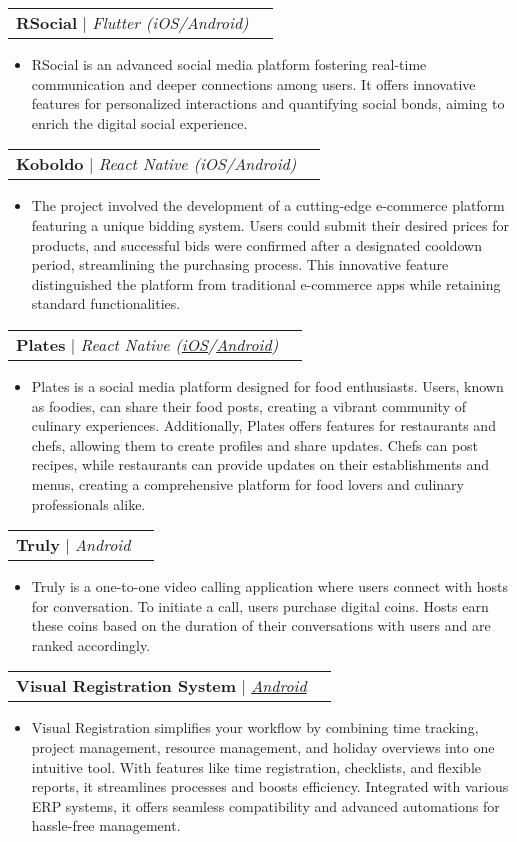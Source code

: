 \documentclass[letterpaper,11pt]{article}
\makeatletter
\newcommand{\resumeItem}[1]{
  \item\small{
    {#1 \vspace{-2pt}}
  }
}
\newcommand{\resumeProjectHeading}[2]{
    \vspace{-2pt}\item
    \begin{tabular*}{0.97\textwidth}{l@{\extracolsep{\fill}}r}
      \small#1 & #2 \\
    \end{tabular*}\vspace{-7pt}
}
\newcommand{\resumeItemListStart}{\begin{itemize}}
\newcommand{\resumeItemListEnd}{\end{itemize}\vspace{-5pt}}
\makeatother
\begin{document}
    \resumeProjectHeading
        {\textbf{RSocial} $|$ \emph{{Flutter (iOS/Android)}}}{}
          \resumeItemListStart
            \resumeItem{RSocial is an advanced social media platform fostering real-time communication and deeper connections among users. It offers innovative features for personalized interactions and quantifying social bonds, aiming to enrich the digital social experience.}
          \resumeItemListEnd

    \resumeProjectHeading
        {\textbf{Koboldo} $|$ \emph{{React Native (iOS/Android)}}}{}
          \resumeItemListStart
            \resumeItem{The project involved the development of a cutting-edge e-commerce platform featuring a unique bidding system. Users could submit their desired prices for products, and successful bids were confirmed after a designated cooldown period, streamlining the purchasing process. This innovative feature distinguished the platform from traditional e-commerce apps while retaining standard functionalities.}
          \resumeItemListEnd
          
    \resumeProjectHeading
        {\textbf{Plates} $|$ \emph{{React Native (\href{https://apps.apple.com/us/app/plates-social/id1240670722}{\color{blue}iOS}/\href{https://play.google.com/store/apps/details?id=com.platessocial.app}{\color{blue}Android}})}}{}
          \resumeItemListStart
            \resumeItem{Plates is a social media platform designed for food enthusiasts. Users, known as foodies, can share their food posts, creating a vibrant community of culinary experiences. Additionally, Plates offers features for restaurants and chefs, allowing them to create profiles and share updates. Chefs can post recipes, while restaurants can provide updates on their establishments and menus, creating a comprehensive platform for food lovers and culinary professionals alike.}
          \resumeItemListEnd
          
    \resumeProjectHeading
        {\textbf{Truly} $|$ \emph{{Android}}}{}
          \resumeItemListStart
            \resumeItem{Truly is a one-to-one video calling application where users connect with hosts for conversation. To initiate a call, users purchase digital coins. Hosts earn these coins based on the duration of their conversations with users and are ranked accordingly.}
          \resumeItemListEnd

    \resumeProjectHeading
        {\textbf{Visual Registration System} $|$ \emph{\href{https://play.google.com/store/apps/details?id=com.visualregistration.v2}{\color{blue}Android}}}{}
          \resumeItemListStart
            \resumeItem{Visual Registration simplifies your workflow by combining time tracking, project management, resource management, and holiday overviews into one intuitive tool. With features like time registration, checklists, and flexible reports, it streamlines processes and boosts efficiency. Integrated with various ERP systems, it offers seamless compatibility and advanced automations for hassle-free management.}
          \resumeItemListEnd
\end{document}
